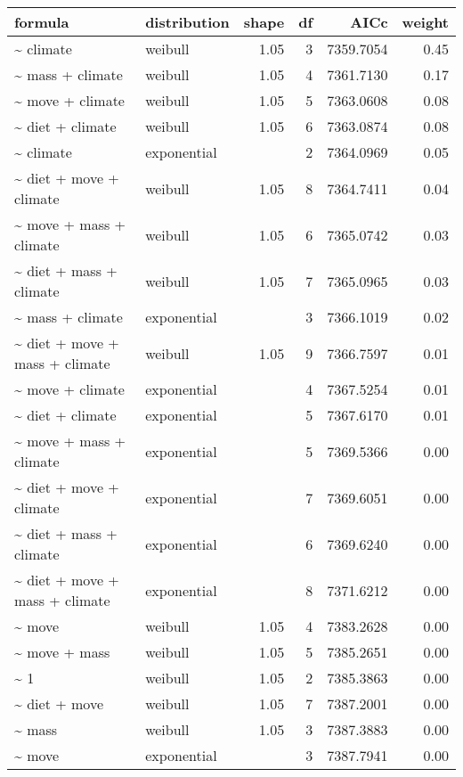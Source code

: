 \begin{table}[ht]
\centering
\begin{tabular}{llrrrr}
 formula & distribution & shape & df & AICc & weight \\ 
  \hline
\~{} climate & weibull & 1.05 & 3 & 7359.7054 & 0.45 \\ 
  \~{} mass + climate & weibull & 1.05 & 4 & 7361.7130 & 0.17 \\ 
  \~{} move + climate & weibull & 1.05 & 5 & 7363.0608 & 0.08 \\ 
  \~{} diet + climate & weibull & 1.05 & 6 & 7363.0874 & 0.08 \\ 
  \~{} climate & exponential &  & 2 & 7364.0969 & 0.05 \\ 
  \~{} diet + move + climate & weibull & 1.05 & 8 & 7364.7411 & 0.04 \\ 
  \~{} move + mass + climate & weibull & 1.05 & 6 & 7365.0742 & 0.03 \\ 
  \~{} diet + mass + climate & weibull & 1.05 & 7 & 7365.0965 & 0.03 \\ 
  \~{} mass + climate & exponential &  & 3 & 7366.1019 & 0.02 \\ 
  \~{} diet + move + mass + climate & weibull & 1.05 & 9 & 7366.7597 & 0.01 \\ 
  \~{} move + climate & exponential &  & 4 & 7367.5254 & 0.01 \\ 
  \~{} diet + climate & exponential &  & 5 & 7367.6170 & 0.01 \\ 
  \~{} move + mass + climate & exponential &  & 5 & 7369.5366 & 0.00 \\ 
  \~{} diet + move + climate & exponential &  & 7 & 7369.6051 & 0.00 \\ 
  \~{} diet + mass + climate & exponential &  & 6 & 7369.6240 & 0.00 \\ 
  \~{} diet + move + mass + climate & exponential &  & 8 & 7371.6212 & 0.00 \\ 
  \~{} move & weibull & 1.05 & 4 & 7383.2628 & 0.00 \\ 
  \~{} move + mass & weibull & 1.05 & 5 & 7385.2651 & 0.00 \\ 
  \~{} 1 & weibull & 1.05 & 2 & 7385.3863 & 0.00 \\ 
  \~{} diet + move & weibull & 1.05 & 7 & 7387.2001 & 0.00 \\ 
  \~{} mass & weibull & 1.05 & 3 & 7387.3883 & 0.00 \\ 
  \~{} move & exponential &  & 3 & 7387.7941 & 0.00 \\ 

\end{tabular}
\end{table}
